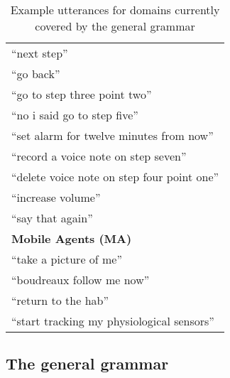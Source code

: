 \documentclass[11pt]{article}
\begin{document}
\begin{table}
\begin{center}
\begin{tabular}{|l|}
``next step''\\
``go back''\\
``go to step three point two''\\
``no i said go to step five''\\
``set alarm for twelve minutes from now''\\
``record a voice note on step seven''\\
``delete voice note on step four point one''\\
``increase volume''\\
``say that again''\\
\hline
{\bf Mobile Agents (MA)}\\
``take a picture of me''\\
``boudreaux follow me now''\\
``return to the hab''\\
``start tracking my physiological sensors''\\
\hline
\end{tabular}
\caption{Example utterances for domains currently covered by the
general grammar}
\label{Table:DomainExamples}
\end{center}
\end{table}

\subsection{The general grammar}
\label{Section:GeneralGrammar}
\end{document}
